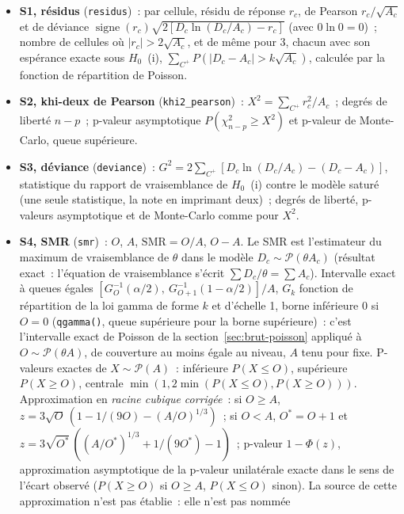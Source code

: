 \documentclass[a4paper,11pt]{article}
\newcommand{\code}[1]{\texttt{\small #1}}
\begin{document}
{\sloppy
\begin{itemize}[leftmargin=*, itemsep=2pt]
  \item \textbf{S1, résidus} (\code{residus})~: par cellule, résidu de
    réponse $r_c$, de Pearson $r_c / \sqrt{A_c}$ et de déviance
    $\operatorname{signe}(r_c)\sqrt{2[D_c \ln(D_c/A_c) - r_c]}$ (avec $0
    \ln 0 = 0$)~; nombre de cellules où $|r_c| > 2\sqrt{A_c}$, et de même
    pour 3, chacun avec son espérance exacte sous $H_0$~(i), $\sum_{C^{+}}
    P(|D_c - A_c| > k\sqrt{A_c})$, calculée par la fonction de répartition
    de Poisson.
  \item \textbf{S2, khi-deux de Pearson} (\code{khi2\_pearson})~: $X^2 =
    \sum_{C^{+}} r_c^2 / A_c$~; degrés de liberté $n - p$~; p-valeur
    asymptotique $P(\chi^2_{n-p} \ge X^2)$ et p-valeur de Monte-Carlo, queue
    supérieure.
  \item \textbf{S3, déviance} (\code{deviance})~: $G^2 = 2\sum_{C^{+}} [D_c
    \ln(D_c/A_c) - (D_c - A_c)]$, statistique du rapport de vraisemblance
    de $H_0$~(i) contre le modèle saturé (une seule statistique, la note
    en imprimant deux)~; degrés de liberté, p-valeurs asymptotique et de
    Monte-Carlo comme pour $X^2$.
  \item \textbf{S4, SMR} (\code{smr})~: $O$, $A$, $\mathrm{SMR} = O/A$,
    $O - A$. Le SMR est l'estimateur du maximum de vraisemblance de $\theta$
    dans le modèle $D_c \sim \mathcal{P}(\theta A_c)$ (résultat exact~:
    l'équation de vraisemblance s'écrit $\sum D_c / \theta = \sum A_c$).
    Intervalle exact à queues égales $[G_O^{-1}(\alpha/2),\ G_{O+1}^{-1}(1 -
    \alpha/2)] / A$, $G_k$ fonction de répartition de la loi gamma de forme
    $k$ et d'échelle 1, borne inférieure $0$ si $O = 0$ (\code{qgamma()},
    queue supérieure pour la borne supérieure)~: c'est l'intervalle exact de
    Poisson de la section~\ref{sec:brut-poisson} appliqué à $O \sim
    \mathcal{P}(\theta A)$, de couverture au moins égale au niveau, $A$
    tenu pour fixe. P-valeurs exactes de $X \sim \mathcal{P}(A)$~:
    inférieure $P(X \le O)$, supérieure $P(X \ge O)$, centrale $\min(1,
    2\min(P(X \le O), P(X \ge O)))$. Approximation en \emph{racine cubique
    corrigée}~: si $O \ge A$, $z = 3\sqrt{O}\,(1 - 1/(9O) -
    (A/O)^{1/3})$~; si $O < A$, $O^{*} = O + 1$ et $z = 3\sqrt{O^{*}}\,((A/O^{*})^{1/3}
    + 1/(9O^{*}) - 1)$~; p-valeur $1 - \Phi(z)$, approximation asymptotique
    de la p-valeur unilatérale exacte dans le sens de l'écart observé
    ($P(X \ge O)$ si $O \ge A$, $P(X \le O)$ sinon). La source de cette
    approximation n'est pas établie~: elle n'est pas nommée

\end{itemize}}
\end{document}
